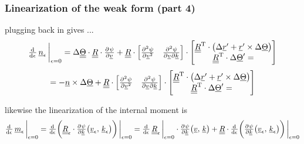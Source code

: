 \begin{frame}
  \frametitle{Linearization of the weak form (part 4)}
  
  plugging back in gives ...
  \begin{displaymath}
    \od{}{\epsilon} \, \underline{n}_{\epsilon} \sVert[3]_{\epsilon=0} = 
    \Delta \doubleunderline{\Theta} \cdot \doubleunderline{R} \cdot \pd{\psi}{\underline{v}} +
    \doubleunderline{R} \cdot
    \begin{bmatrix}
      \pd[2]{\psi}{\underline{v}} & \md{\psi}{2}{\underline{v}}{}{\underline{k}}{}
    \end{bmatrix} \cdot
    \begin{bmatrix}
      \doubleunderline{R}^{\mathrm{T}} \cdot \bigl( \Delta \underline{r}^{\prime} + \underline{r}^{\prime} \times \Delta \underline{\Theta} \bigr) \\
      \doubleunderline{R}^{\mathrm{T}} \cdot \Delta \underline{\Theta}^{\prime} =
    \end{bmatrix}
  \end{displaymath}
  \begin{displaymath}
    = - \underline{n} \times \Delta \underline{\Theta} + 
    \doubleunderline{R} \cdot
    \begin{bmatrix}
      \pd[2]{\psi}{\underline{v}} & \md{\psi}{2}{\underline{v}}{}{\underline{k}}{}
    \end{bmatrix} \cdot
    \begin{bmatrix}
      \doubleunderline{R}^{\mathrm{T}} \cdot \bigl( \Delta \underline{r}^{\prime} + \underline{r}^{\prime} \times \Delta \underline{\Theta} \bigr) \\
      \doubleunderline{R}^{\mathrm{T}} \cdot \Delta \underline{\Theta}^{\prime} =
    \end{bmatrix}
  \end{displaymath}
  
  
  \vspace{1em}
  likewise the linearization of the internal moment is
  \begin{displaymath}
    \od{}{\epsilon} \, \underline{m}_{\epsilon} \sVert[3]_{\epsilon=0} = 
    \od{}{\epsilon} \biggl(
      \doubleunderline{R}_{\epsilon} \cdot \pd{\psi}{\underline{k}} \bigl( \underline{v}_{\epsilon}, \, \underline{k}_{\epsilon} \bigr)
    \biggr) \sVert[3]_{\epsilon=0} =
    \od{}{\epsilon} \, \doubleunderline{R}_{\epsilon} \sVert[3]_{\epsilon=0} \cdot \pd{\psi}{\underline{k}} \bigl( \underline{v}, \, \underline{k} \bigr) +
    \doubleunderline{R} \cdot \od{}{\epsilon} \biggl( \pd{\psi}{\underline{k}} \bigl( \underline{v}_{\epsilon}, \, \underline{k}_{\epsilon} \bigr) \biggr) \sVert[3]_{\epsilon=0}
  \end{displaymath}
  

\end{frame}
